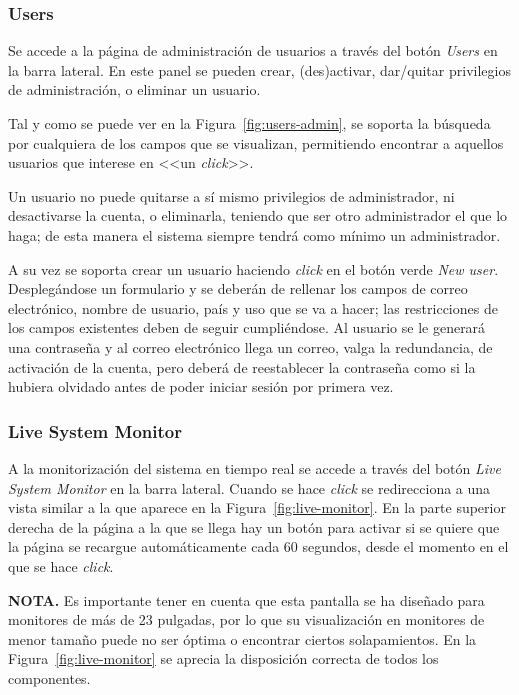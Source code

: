 \subsubsection{Users}
Se accede a la página de administración de usuarios a través del botón \textit{Users} en la barra lateral. En este panel se pueden crear, (des)activar, dar/quitar privilegios de administración, o eliminar un usuario.

Tal y como se puede ver en la Figura~\ref{fig:users-admin}, se soporta la búsqueda por cualquiera de los campos que se visualizan, permitiendo encontrar a aquellos usuarios que interese en <<un \textit{click}>>. 


Un usuario no puede quitarse a sí mismo privilegios de administrador, ni desactivarse la cuenta, o eliminarla, teniendo que ser otro administrador el que lo haga; de esta manera el sistema siempre tendrá como mínimo un administrador.

A su vez se soporta crear un usuario haciendo \textit{click} en el botón verde \textit{New user}. Desplegándose un formulario y se deberán de rellenar los campos de correo electrónico, nombre de usuario, país y uso que se va a hacer; las restricciones de los campos existentes deben de seguir cumpliéndose. Al usuario se le generará una contraseña y al correo electrónico llega un correo, valga la redundancia, de activación de la cuenta, pero deberá de reestablecer la contraseña como si la hubiera olvidado antes de poder iniciar sesión por primera vez.

\subsubsection{Live System Monitor}
A la monitorización del sistema en tiempo real se accede a través del botón \textit{Live System Monitor} en la barra lateral. Cuando se hace \textit{click} se redirecciona a una vista similar a la que aparece en la Figura~\ref{fig:live-monitor}. En la parte superior derecha de la página a la que se llega hay un botón para activar si se quiere que la página se recargue automáticamente cada 60 segundos, desde el momento en el que se hace \textit{click}.


\textbf{NOTA.} Es importante tener en cuenta que esta pantalla se ha diseñado para monitores de más de 23 pulgadas, por lo que su visualización en monitores de menor tamaño puede no ser óptima o encontrar ciertos solapamientos. En la Figura~\ref{fig:live-monitor} se aprecia la disposición correcta de todos los componentes.

